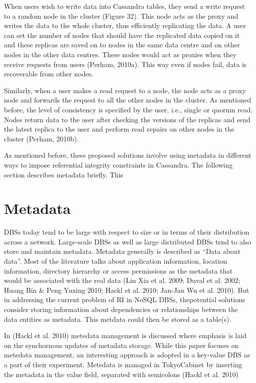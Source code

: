 When users wish to write data into Cassandra tables, they send a write request
to a random node in the cluster (Figure 32). This node acts as the proxy and
writes the data to the whole cluster, thus efficiently replicating the data.
A user can set the number of nodes that should have the
replicated data copied on it and these replicas are saved on to nodes in the
same data centre and on other nodes in the other data centres. These nodes would act
as proxies when they receive requests from users (Perham, 2010a). This way even
if nodes fail, data is recoverable from other nodes.

Similarly, when a user makes a read request to a node, the node acts as a proxy
node and forwards the request to all the other nodes in the cluster. As
mentioned before, the level of consistency is specified by the user, i.e.,
single or quorum read. Nodes return data to the user after checking the versions
of the replicas and send the latest replica to the user and perform read repairs
on other nodes in the cluster (Perham, 2010b).

As mentioned before, these proposed solutions involve using metadata in
different ways to impose referential integrity constraints in Cassandra. The
following section describes metadata briefly. This 


\section{Metadata}\label{s:metadata}
DBSs today tend to be large with respect to size or in terms of their
distribution across a network. Large-scale DBSs as well as large distributed
DBSs tend to also store and maintain metadata. Metadata generally is described
as ``Data about data''. Most of the literature talks about application
information, location information, directory hierarchy or access permissions as
the metadata that would be associated with the real data (Lin Xia et al. 2009;
Duval et al. 2002; Huang Bin \& Peng Yuxing 2010; Hackl et al. 2010; Jan-Jan Wu
et al. 2010). But in addressing the current problem of RI in NoSQL DBSs,
thepotential solutions consider storing information about dependencies or
relationships between the data entities as metadata. This metdata could then be
stored as a table(s).

In (Hackl et al. 2010) metedata management is discussed where emphasis is laid
on the synchornous updates of metadata storage. While this paper focuses on
metedata management, an interesting approach is adopted in a key-value DBS as a
part of their experiment. Metedata is managed in TokyoCabinet by inserting the
metadata in the value field, separated with semicolons (Hackl et al. 2010)

